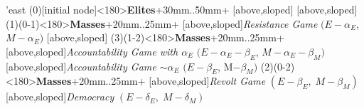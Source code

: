 	\begin{istgame}[font=\footnotesize]
	\centering
	\setistgrowdirection'{east}
	\xtShowArrows
	\istroot(0)[initial node]<180>{\textbf{Elites}}+30mm..50mm+
	[above,sloped]  [above,sloped] \endist
	\istroot(1)(0-1)<180>{\textbf{Masses}}+20mm..25mm+
	[above,sloped]{\textit{Resistance Game} $(E- \alpha_{E}$, $M-\alpha_{E})$ }
	[above,sloped]{ }  \endist
	\istroot(3)(1-2)<180>{\textbf{Masses}}+20mm..25mm+
	[above,sloped]{\textit{Accountability Game with $\alpha_{E}$ }
		$(E- \alpha_{E}- \beta_{E}$, $M-\alpha_{E}-\beta_{M})$}
	[above,sloped]{\textit{Accountability Game $\sim\alpha_{E}$} 
		$(E- \beta_{E}$, M$-\beta_{M})$} \endist
	\istroot(2)(0-2)<180>{\textbf{Masses}}+20mm..25mm+
	[above,sloped]{\textit{Revolt Game} $(E - \beta_{E},\; M-\beta_{M})$}
	[above,sloped]{\textit{Democracy} $(E -\delta_{E},\; M- \delta_{M})$} \endist
\end{istgame}